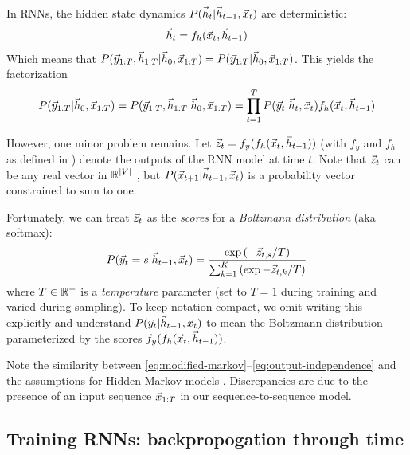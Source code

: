 In RNNs, the hidden state dynamics $P(\vec{h}_t | \vec{h}_{t-1}, \vec{x}_t)$ are deterministic:
\begin{equation}
  \vec{h}_t = f_h(\vec{x}_t, \vec{h}_{t-1})
\end{equation}
Which means that $P(\vec{y}_{1:T}, \vec{h}_{1:T} | \vec{h}_0, \vec{x}_{1:T}) = P(\vec{y}_{1:T} | \vec{h}_0, \vec{x}_{1:T})$.
This yields the factorization
\begin{equation}
  P(\vec{y}_{1:T} | \vec{h}_0, \vec{x}_{1:T})
  = P(\vec{y}_{1:T}, \vec{h}_{1:T} | \vec{h}_0, \vec{x}_{1:T})
  = \prod_{t=1}^T P(\vec{y}_t | \vec{h}_t, \vec{x}_t) f_h(\vec{x}_t, \vec{h}_{t-1})
\end{equation}

However, one minor problem remains. Let $\vec{z}_t = f_y(f_h(\vec{x}_t, \vec{h}_{t-1}))$ (with
$f_y$ and $f_h$ as defined in ) denote the outputs of the RNN model
at time $t$. Note that $\vec{z}_t$ can be any real vector in $\mathbb{R}^{|V|}$
, but $P(\vec{x}_{t+1} | \vec{h}_{t-1}, \vec{x}_{t})$ is
a probability vector constrained to sum to one.

Fortunately, we can treat $\vec{z}_t$ as the \emph{scores} for a \emph{Boltzmann
distribution} (aka softmax):
\begin{equation}\label{eq:boltzmann-dist}
    P( \vec{y}_{t} = s | \vec{h}_{t-1}, \vec{x}_t )
    = \frac{\exp \left(-\vec{z}_{t,s}/T\right) }{ \sum_{k=1}^{K} \left(\exp -\vec{z}_{t,k}/T\right)}
\end{equation}
where $T \in \mathbb{R}^+$ is a \emph{temperature} parameter (set to $T=1$ during training and varied during sampling).
To keep notation compact, we omit writing this explicitly and understand $P(\vec{y}_t | \vec{h}_{t-1}, \vec{x}_t)$ to mean
the Boltzmann distribution parameterized by the scores $f_y(f_h(\vec{x}_t, \vec{h}_{t-1}))$.

Note the similarity between \cref{eq:modified-markov}--\cref{eq:output-independence}
and the assumptions for Hidden Markov models \citep{ramage2007hidden}. Discrepancies are due
to the presence of an input sequence $\vec{x}_{1:T}$ in our sequence-to-sequence model.



\subsection{Training RNNs: backpropogation through time}


